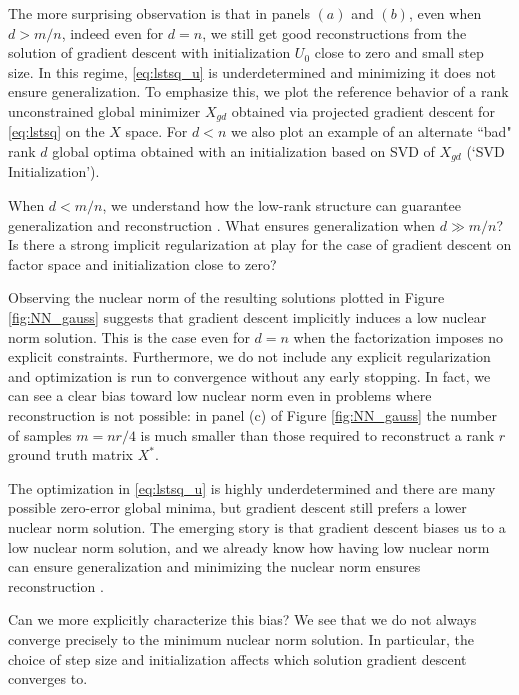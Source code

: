 The more surprising observation is that in panels $(a)$ and $(b)$, even when $d>m/n$, indeed even for $d=n$, we still get good reconstructions from the solution of gradient descent with  initialization $U_0$ close to zero and small step size.  In this regime, \eqref{eq:lstsq_u} is underdetermined and minimizing it does not ensure generalization. To emphasize this, we plot the reference behavior of a rank unconstrained global minimizer $X_{gd}$ obtained via projected gradient descent for \eqref{eq:lstsq} on the $X$ space. For $d<n$ we also plot an example of an alternate ``bad" rank $d$ global optima obtained with an initialization based on SVD of $X_{gd}$ (`{SVD Initialization}').

         When $d<m/n$, we understand how the low-rank structure can guarantee generalization \citep{srebro2005generalization} and reconstruction \citep{keshavan2012efficient,bhojanapalli2016global,ge2016matrix}. What ensures generalization when $d\gg m/n$? Is there a strong implicit regularization at play for the case of gradient descent on factor space and initialization close to zero?

Observing the nuclear norm of the resulting solutions plotted in Figure \ref{fig:NN_gauss} suggests that gradient descent implicitly induces a low nuclear norm solution.  This is the case even for $d=n$ when the factorization imposes no explicit constraints. Furthermore, we do not include any explicit regularization and optimization is run to convergence without any early stopping.  In fact, we can see a clear bias toward low nuclear norm even in problems where reconstruction is not possible: in panel (c) of Figure
\ref{fig:NN_gauss} the number of samples $m=nr/4$ is much smaller than those required to reconstruct a rank $r$ ground truth matrix $X^*$.

The optimization in \eqref{eq:lstsq_u} is highly underdetermined and there are many possible zero-error global minima, but gradient descent still prefers a lower nuclear norm solution.  The emerging story is that gradient descent biases us to a low nuclear norm solution, and we already know how having low nuclear norm can ensure generalization \citep{srebro2005rank,foygel2011concentration} and minimizing the nuclear norm ensures reconstruction \citep{recht2010guaranteed,candes2009exact}.

Can we more explicitly characterize this bias?  We see that we do not always converge precisely to the minimum nuclear norm solution. In particular, the choice of step size and initialization affects which solution gradient descent converges to.

